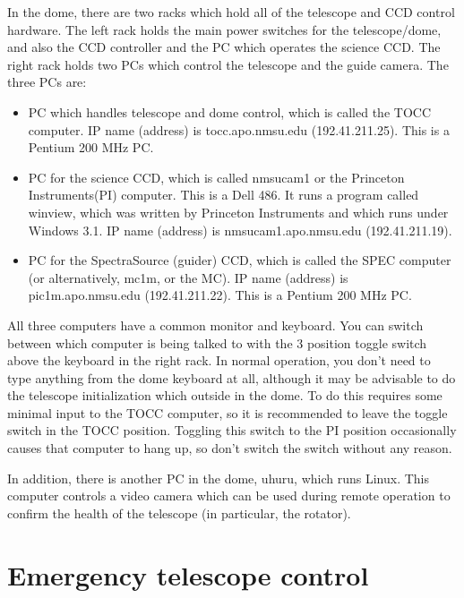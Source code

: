 \documentclass[10pt]{report}
\renewcommand{\[}{\begin{eqnarray}}
\renewcommand{\]}{\end{eqnarray}}
\begin{document}
In the dome, there are two racks which hold all of the telescope and CCD
control hardware. The left rack holds the main power switches for the
telescope/dome, and also the CCD controller and the PC which operates the
science CCD. The right rack holds two PCs which control the telescope and
the guide camera. The three PCs are:
\begin{itemize}
\item PC which handles telescope and dome control, which is called the
TOCC computer. IP name (address) is tocc.apo.nmsu.edu (192.41.211.25).
This is a Pentium 200 MHz PC.

\item PC for the science CCD, which is called nmsucam1 or the Princeton
Instruments(PI) computer. This is a Dell 486. It runs a program called
winview, which was written by Princeton Instruments and which
runs under Windows 3.1. IP name (address) is nmsucam1.apo.nmsu.edu 
(192.41.211.19).

\item PC for the SpectraSource (guider) CCD, which is called the SPEC computer
(or alternatively, mc1m, or the MC). IP name (address) is pic1m.apo.nmsu.edu 
(192.41.211.22). This is a Pentium 200 MHz PC.
\end{itemize}

All three computers have a common monitor and keyboard. You can switch 
between which computer is being talked to with the 3 position toggle
switch above the keyboard in the right rack. In normal operation, you
don't need to type anything from the dome keyboard at all, although it
may be advisable to do the telescope initialization which outside in the
dome. To do this requires some minimal input to the TOCC computer, so
it is recommended to leave the toggle switch in the TOCC position. 
Toggling this switch to the PI position occasionally causes that computer
to hang up, so don't switch the switch without any reason.

In addition, there is another PC in the dome, uhuru, which runs Linux. 
This computer controls a video camera which can be used during remote
operation to confirm the health of the telescope (in particular, the
rotator).

\section{Emergency telescope control}
\end{document}
